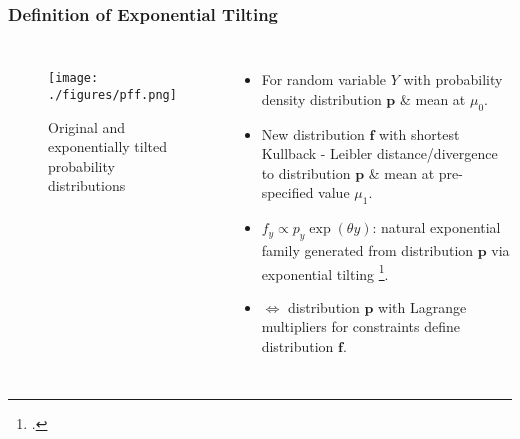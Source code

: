 \documentclass[hyperref={bookmarks=false},aspectratio=169]{beamer}
\begin{document}
\begin{frame}
\frametitle{Definition of Exponential Tilting}

\begin{columns}


\begin{figure}
    \centering
    \texttt{[image: ./figures/pff.png]}
    \caption{Original and exponentially tilted probability distributions}
    \label{fig:OriginalETPMF2}
\end{figure}

\begin{itemize}
    \item For random variable $Y$ with probability density distribution $\boldsymbol{p}$ {\&} mean at $\mu_0$.
    \item New distribution $\boldsymbol{f}$ with shortest Kullback - Leibler distance/divergence to distribution $\boldsymbol{p}$ {\&} mean at pre-specified value $\mu_1$.
    \item $f_y \propto p_y  \exp (\theta y)$: natural exponential family generated from distribution $\boldsymbol{p}$ via exponential tilting \footcite{EETCarloCamarda}.
    \item $\Longleftrightarrow$ distribution $\boldsymbol{p}$ with Lagrange multipliers for constraints define distribution $\boldsymbol{f}$.
\end{itemize}

\end{columns}
\end{frame}
\end{document}
